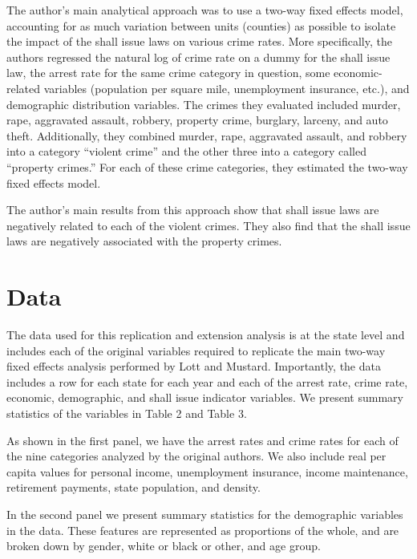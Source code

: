 \documentclass{article}
\begin{document}


The author's main analytical approach was to use a two-way fixed effects model, accounting for as much variation between units (counties) as possible to isolate the impact of the shall issue laws on various crime rates. More specifically, the authors regressed the natural log of crime rate on a dummy for the shall issue law, the arrest rate for the same crime category in question, some economic-related variables (population per square mile, unemployment insurance, etc.), and demographic distribution variables. The crimes they evaluated included murder, rape, aggravated assault, robbery, property crime, burglary, larceny, and auto theft. Additionally, they combined murder, rape, aggravated assault, and robbery into a category ``violent crime'' and the other three into a category called ``property crimes.'' For each of these crime categories, they estimated the two-way fixed effects model.

The author's main results from this approach show that shall issue laws are negatively related to each of the violent crimes. They also find that the shall issue laws are negatively associated with the property crimes. 

\section{Data}

The data used for this replication and extension analysis is at the state level and includes each of the original variables required to replicate the main two-way fixed effects analysis performed by Lott and Mustard. Importantly, the data includes a row for each state for each year and each of the arrest rate, crime rate, economic, demographic, and shall issue indicator variables. We present summary statistics of the variables in Table 2 and Table 3. 



As shown in the first panel, we have the arrest rates and crime rates for each of the nine categories analyzed by the original authors. We also include real per capita values for personal income, unemployment insurance, income maintenance, retirement payments, state population, and density.



In the second panel we present summary statistics for the demographic variables in the data. These features are represented as proportions of the whole, and are broken down by gender, white or black or other, and age group. 
\end{document}
